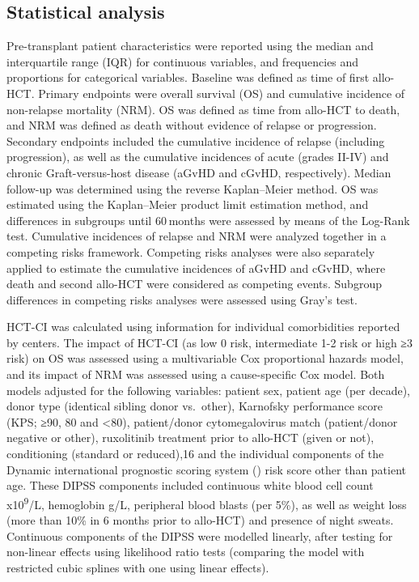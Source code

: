 \documentclass[
  letterpaper,
  DIV=11,
  numbers=noendperiod]{scrreprt}
\begin{document}
\subsection*{Statistical analysis}\label{statistical-analysis}

Pre-transplant patient characteristics were reported using the median
and interquartile range (IQR) for continuous variables, and frequencies
and proportions for categorical variables. Baseline was defined as time
of first allo-HCT. Primary endpoints were overall survival (OS) and
cumulative incidence of non-relapse mortality (NRM). OS was defined as
time from allo-HCT to death, and NRM was defined as death without
evidence of relapse or progression. Secondary endpoints included the
cumulative incidence of relapse (including progression), as well as the
cumulative incidences of acute (grades II-IV) and chronic
Graft-versus-host disease (aGvHD and cGvHD, respectively). Median
follow-up was determined using the reverse Kaplan--Meier method. OS was
estimated using the Kaplan--Meier product limit estimation method, and
differences in subgroups until 60 months were assessed by means of the
Log-Rank test. Cumulative incidences of relapse and NRM were analyzed
together in a competing risks framework. Competing risks analyses were
also separately applied to estimate the cumulative incidences of aGvHD
and cGvHD, where death and second allo-HCT were considered as competing
events. Subgroup differences in competing risks analyses were assessed
using Gray's test.

HCT-CI was calculated using information for individual comorbidities
reported by centers. The impact of HCT-CI (as low 0 risk, intermediate
1-2 risk or high ≥3 risk) on OS was assessed using a multivariable Cox
proportional hazards model, and its impact of NRM was assessed using a
cause-specific Cox model. Both models adjusted for the following
variables: patient sex, patient age (per decade), donor type (identical
sibling donor vs.~other), Karnofsky performance score (KPS; ≥90, 80 and
\textless80), patient/donor cytomegalovirus match (patient/donor
negative or other), ruxolitinib treatment prior to allo-HCT (given or
not), conditioning (standard or reduced),16 and the individual
components of the Dynamic international prognostic scoring system
() risk score other than patient age. These DIPSS components
included continuous white blood cell count x10\textsuperscript{9}/L,
hemoglobin g/L, peripheral blood blasts (per 5\%), as well as weight
loss (more than 10\% in 6 months prior to allo-HCT) and presence of
night sweats. Continuous components of the DIPSS were modelled linearly,
after testing for non-linear effects using likelihood ratio tests
(comparing the model with restricted cubic splines with one using linear
effects).
\end{document}
